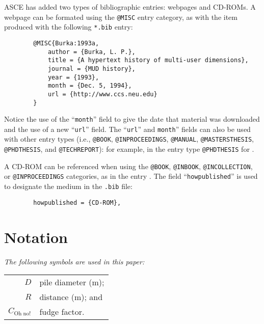 \documentclass[Journal,letterpaper]{ascelike-new}
\begin{document}
	ASCE has added two types of bibliographic entries:
	webpages and CD-ROMs.  A webpage can be formated using the
	\texttt{@MISC} entry category, as with the item \cite{Burka:1993a} produced
	with the following \texttt{*.bib} entry:
	\begin{verbatim}
		@MISC{Burka:1993a,
			author = {Burka, L. P.},
			title = {A hypertext history of multi-user dimensions},
			journal = {MUD history},
			year = {1993},
			month = {Dec. 5, 1994},
			url = {http://www.ccs.neu.edu}
		}
	\end{verbatim}
	Notice the use of the ``\texttt{month}'' field to give the date that material
	was downloaded and the use of a new ``\texttt{url}'' field.
	The ``\texttt{url}'' and \texttt{month}'' 
	fields can also be used with other entry types
	(i.e., \texttt{@BOOK}, \texttt{@INPROCEEDINGS}, \texttt{@MANUAL},
	\texttt{@MASTERSTHESIS}, \texttt{@PHDTHESIS}, and \texttt{@TECHREPORT}):
	for example, in the entry type \texttt{@PHDTHESIS} for \cite{Wichtmann:2005a}.
	\par
	A CD-ROM can be referenced when using the \texttt{@BOOK}, \texttt{@INBOOK},
	\texttt{@INCOLLECTION}, or \texttt{@INPROCEEDINGS} categories, 
	as in the entry \cite{Liggett:1998a}.
	The field ``\texttt{howpublished}'' is used to designate the medium
	in the \texttt{.bib} file:
	\begin{verbatim}
		howpublished = {CD-ROM},
	\end{verbatim}
	\pagebreak
	\appendix
	\section{Notation}
	\label{app:notation}
	\emph{The following symbols are used in this paper:}%
	\nopagebreak
	\par
	\begin{tabular}{r  @{\hspace{1em}=\hspace{1em}}  l}
		$D$                    & pile diameter (m); \\
		$R$                    & distance (m);      and\\
		$C_{\mathrm{Oh\;no!}}$ & fudge factor.
	\end{tabular}
	
\end{document}
